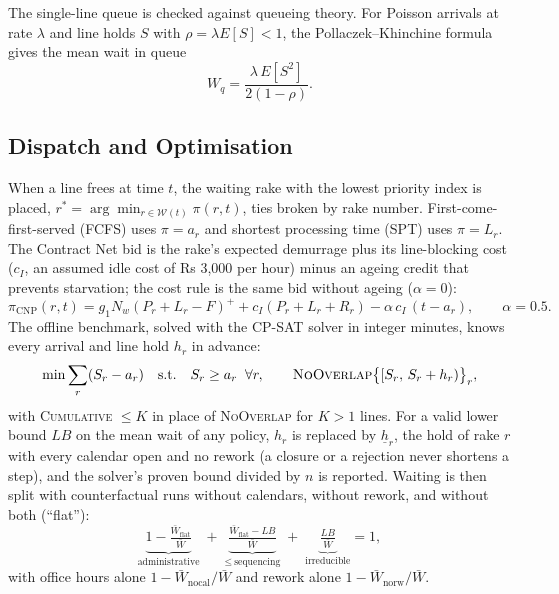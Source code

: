 The single-line queue is checked against queueing theory. For Poisson arrivals at rate $\lambda$ and line holds $S$ with $\rho = \lambda E[S] < 1$, the Pollaczek--Khinchine formula gives the mean wait in queue \cite{gross}
\begin{equation}
W_q = \frac{\lambda\, E[S^2]}{2(1 - \rho)} .
\label{eq:pk}
\end{equation}

\subsection{Dispatch and Optimisation}
When a line frees at time $t$, the waiting rake with the lowest priority index is placed, $r^* = \arg\min_{r \in \mathcal{W}(t)} \pi(r, t)$, ties broken by rake number. First-come-first-served (FCFS) uses $\pi = a_r$ and shortest processing time (SPT) uses $\pi = L_r$. The Contract Net bid \cite{smith} is the rake's expected demurrage plus its line-blocking cost ($c_I$, an assumed idle cost of Rs 3,000 per hour) minus an ageing credit that prevents starvation; the cost rule is the same bid without ageing ($\alpha = 0$):
\begin{equation}
\pi_{\text{CNP}}(r,t) = g_1 N_w (P_r + L_r - F)^{+} + c_I (P_r + L_r + R_r) - \alpha\, c_I\, (t - a_r), \qquad \alpha = 0.5 .
\label{eq:cnp}
\end{equation}
The offline benchmark, solved with the CP-SAT solver \cite{ortools} in integer minutes, knows every arrival and line hold $h_r$ in advance:
\begin{equation}
\min \sum_{r} (S_r - a_r) \quad \text{s.t.} \quad S_r \ge a_r \;\; \forall r, \qquad \textsc{NoOverlap}\big\{[S_r,\, S_r + h_r)\big\}_r ,
\label{eq:cpsat}
\end{equation}
with \textsc{Cumulative} $\le K$ in place of \textsc{NoOverlap} for $K > 1$ lines. For a valid lower bound $LB$ on the mean wait of any policy, $h_r$ is replaced by $\underline{h}_r$, the hold of rake $r$ with every calendar open and no rework (a closure or a rejection never shortens a step), and the solver's proven bound divided by $n$ is reported. Waiting is then split with counterfactual runs without calendars, without rework, and without both (``flat''):
\begin{equation}
\underbrace{1 - \tfrac{\bar W_{\text{flat}}}{\bar W}}_{\text{administrative}} \;+\; \underbrace{\tfrac{\bar W_{\text{flat}} - LB}{\bar W}}_{\le\ \text{sequencing}} \;+\; \underbrace{\tfrac{LB}{\bar W}}_{\text{irreducible}} = 1,
\label{eq:wsplit}
\end{equation}
with office hours alone $1 - \bar W_{\text{nocal}}/\bar W$ and rework alone $1 - \bar W_{\text{norw}}/\bar W$.

